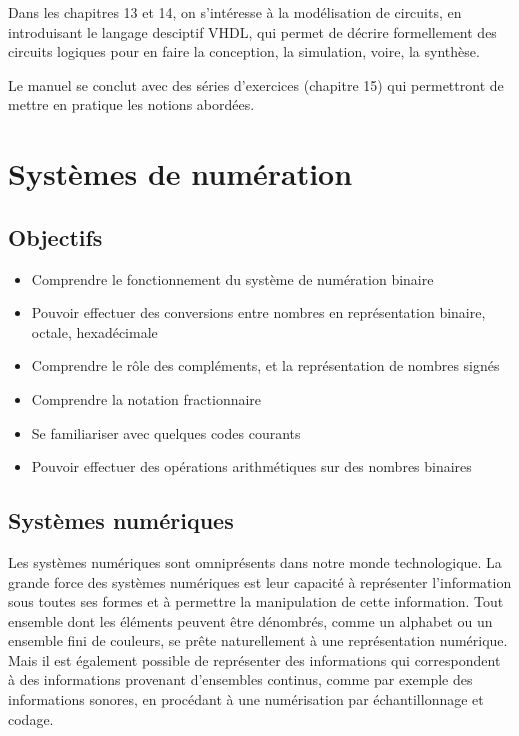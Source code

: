 \documentclass[11pt]{article}
\begin{document}
Dans les chapitres 13 et 14, on s'intéresse à la modélisation de
circuits, en introduisant le langage desciptif VHDL, qui permet de
décrire formellement des circuits logiques pour en faire la
conception, la simulation, voire, la synthèse.

Le manuel se conclut avec des séries d'exercices (chapitre 15) qui
permettront de mettre en pratique les notions abordées.


\setcounter{tocdepth}{3}
\tableofcontents
\listoffigures
\listoftables
\listoflistings



\section{Systèmes de numération}
\label{sec:org184512f}


\subsection{Objectifs}
\label{sec:org4644cb2}

\begin{itemize}
\item Comprendre le fonctionnement du système de numération binaire
\item Pouvoir effectuer des conversions entre nombres en représentation
binaire, octale, hexadécimale
\item Comprendre le rôle des compléments, et la représentation de nombres signés
\item Comprendre la notation fractionnaire
\item Se familiariser avec quelques codes courants
\item Pouvoir effectuer des opérations arithmétiques sur des nombres binaires
\end{itemize}

\subsection{Systèmes numériques}
\label{sec:orgb5e8c8c}

Les systèmes numériques sont omniprésents dans notre monde
technologique. La grande force des systèmes numériques est leur
capacité à représenter l'information sous toutes ses formes et à
permettre la manipulation de cette information. Tout ensemble dont les
éléments peuvent être dénombrés, comme un alphabet ou un ensemble fini
de couleurs, se prête naturellement à une représentation
numérique. Mais il est également possible de représenter des
informations qui correspondent à des informations provenant
d'ensembles continus, comme par exemple des informations sonores, en
procédant à une numérisation par échantillonnage et codage. 
\end{document}
